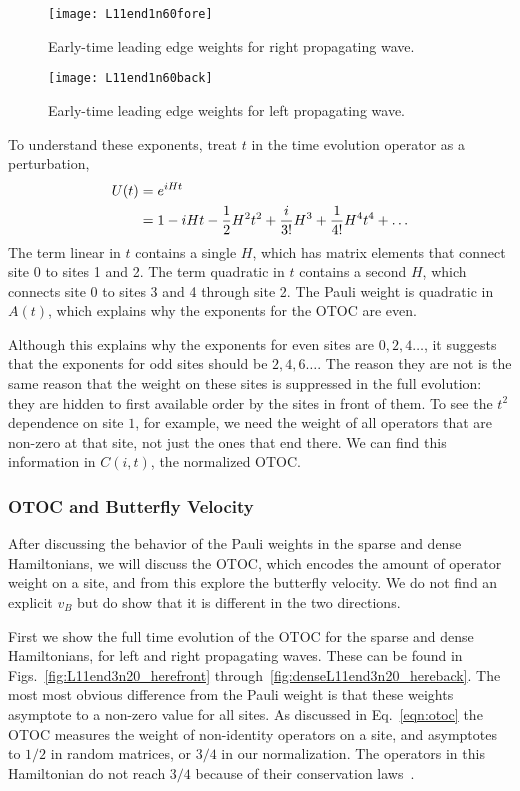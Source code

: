 \begin{figure}
	\centering
	\texttt{[image: L11end1n60fore]}
	\caption{Early-time leading edge weights for right propagating wave.}
	\label{fig:L11end1n60fore}
\end{figure}
\begin{figure}
	\centering
	\texttt{[image: L11end1n60back]}
	\caption{Early-time leading edge weights for left propagating wave.}
	\label{fig:L11end1n60back}
\end{figure}

To understand these exponents, treat $t$ in the time evolution operator as a perturbation,
\begin{align}
U(t) &= e^{iHt}\nonumber\\
&= 1-iHt-\frac{1}{2} H^2t^2+\frac{i}{3!}H^3+\frac{1}{4!}H^4t^4+\dots\label{eqn:expansion}
\end{align}
The term linear in $t$ contains a single $H$, which has matrix elements that connect site 0 to sites 1 and 2. The term quadratic in $t$ contains a second $H$, which connects site 0 to sites 3 and 4 through site 2. The Pauli weight is quadratic in $A(t)$, which explains why the exponents for the OTOC are even.

Although this explains why the exponents for even sites are $0,2,4\dots$, it suggests that the exponents for odd sites should be $2,4,6\dots$. The reason they are not is the same reason that the weight on these sites is suppressed in the full evolution: they are hidden to first available order by the sites in front of them. To see the $t^2$ dependence on site $1$, for example, we need the weight of all operators that are non-zero at that site, not just the ones that end there. We can find this information in $C(i,t)$, the normalized OTOC.

\subsubsection{OTOC and Butterfly Velocity} \label{subsub:otoc}

After discussing the behavior of the Pauli weights in the sparse and dense Hamiltonians, we will discuss the OTOC, which encodes the amount of operator weight on a site, and from this explore the butterfly velocity. We do not find an explicit $v_B$ but do show that it is different in the two directions. 

First we show the full time evolution of the OTOC for the sparse and dense Hamiltonians, for left and right propagating waves. These can be found in Figs.~\ref{fig:L11end3n20_herefront} through~\ref{fig:denseL11end3n20_hereback}. The most most obvious difference from the Pauli weight is that these weights asymptote to a non-zero value for all sites. As discussed in Eq.~\ref{eqn:otoc} the OTOC measures the weight of non-identity operators on a site, and asymptotes to $1/2$ in random matrices, or $3/4$ in our normalization. The operators in this Hamiltonian do not reach $3/4$ because of their conservation laws~\cite{Jonay17, Jonay18}.

